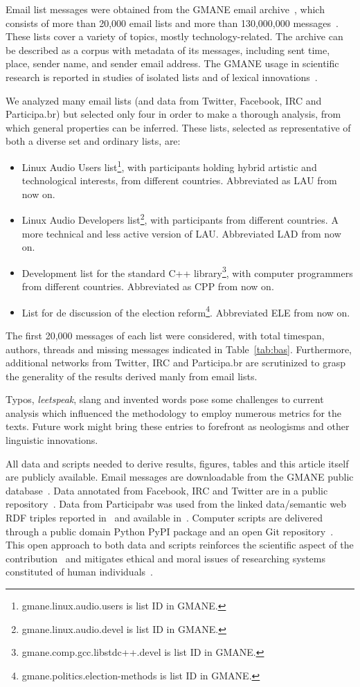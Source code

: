 \documentclass[%
 aip,
 jmp,%
 amsmath,amssymb,
 reprint,%
]{revtex4-1}
\begin{document}
Email list messages were obtained from
the GMANE email archive~\cite{gmanePack}, which consists of more than 20,000 email lists and more than 130,000,000 messages~\cite{GMANEwikipedia}. These lists cover a variety of topics, mostly technology-related. The archive can be described as a corpus with metadata of its messages, including sent time, place, sender name, and sender email address.
The GMANE usage in scientific research is reported in studies of isolated lists and of lexical innovations~\cite{GMANE2,bird}. 

We analyzed many email lists (and data from Twitter, Facebook, IRC and Participa.br) but selected only four in order to make a thorough analysis, from which general properties can be inferred. These lists, selected as representative of both a diverse set and ordinary lists, are:
\begin{itemize}
	\item Linux Audio Users list\footnote{gmane.linux.audio.users is list ID in GMANE.}, with participants holding hybrid artistic and technological interests, from different countries. Abbreviated as LAU from now on.
	\item Linux Audio Developers list\footnote{gmane.linux.audio.devel is list ID in GMANE.}, with participants from different countries. A more technical and less active version of LAU. Abbreviated LAD from now on.
	\item Development list for the standard C++ library\footnote{gmane.comp.gcc.libstdc++.devel is list ID in GMANE.}, with computer programmers from different countries. Abbreviated as CPP from now on.
	\item List for de discussion of the election reform\footnote{gmane.politics.election-methods is list ID in GMANE.}.
		Abbreviated ELE from now on.
\end{itemize} 
The first 20,000 messages of each list were considered, with total timespan, authors, threads and missing messages indicated in Table~\ref{tab:bas}.
Furthermore, additional networks from Twitter, IRC and Participa.br
are scrutinized to grasp the generality of the results derived manly from email lists.

Typos, \emph{leetspeak},
slang and invented words
pose some challenges to current analysis
which influenced the methodology to employ numerous 
metrics for the texts.
Future work might bring these entries to forefront 
as neologisms and other linguistic innovations.

All data and scripts needed to derive results, figures, tables and this article itself
are publicly available.
Email messages are downloadable from the GMANE public database~\cite{GMANEwikipedia}.
Data annotated from Facebook, IRC and Twitter are in a public repository~\cite{fbtwData}.
Data from Participabr was used from the linked data/semantic web RDF triples
reported in~\cite{opa} and available in~\cite{datahub}.
Computer scripts are delivered through a public domain Python PyPI package and
an open Git repository~\cite{gmanePack}.
This open approach to both data and scripts
reinforces the scientific aspect of the contribution~\cite{openSci}
and mitigates ethical and moral issues of researching 
systems constituted of
human individuals~\cite{anPhy,ccs15}.
\end{document}
